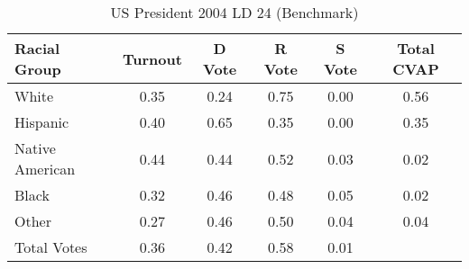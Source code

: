 \begin{table}[htb]
\begin{center}
\caption{US President 2004 LD 24 (Benchmark)}
\label{pres04_cvap_ld_24_benchmark}
\begin{tabular}{lccccc}
  \hline
Racial Group & Turnout & D Vote & R Vote & S Vote & Total CVAP \\ 
  \hline
White & 0.35 & 0.24 & 0.75 & 0.00 & 0.56 \\ 
  Hispanic & 0.40 & 0.65 & 0.35 & 0.00 & 0.35 \\ 
  Native American & 0.44 & 0.44 & 0.52 & 0.03 & 0.02 \\ 
  Black & 0.32 & 0.46 & 0.48 & 0.05 & 0.02 \\ 
  Other & 0.27 & 0.46 & 0.50 & 0.04 & 0.04 \\ 
  Total Votes & 0.36 & 0.42 & 0.58 & 0.01 &  \\ 
   \hline
\end{tabular}
\end{center}
\end{table}
